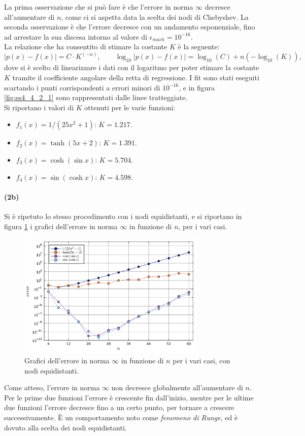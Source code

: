 \documentclass[letterpaper, 12pt]{article}
\begin{document}
La prima osservazione che si può fare è che l'errore in norma $\infty$ decresce all'aumentare di $n$,
come ci si aspetta data la scelta dei nodi di Chebyshev. La seconda osservazione è che l'errore decresce
con un andamento esponenziale, fino ad arrestare la sua discesa intorno al valore di $\epsilon_{mach} = 10^{-16}$. \\
La relazione che ha consentito di stimare la costante $K$ è la seguente:
\begin{equation}
    |p(x)-f(x)| = C \cdot K^(-n), \qquad \log_{10}|p(x)-f(x)| = \log_{10}(C) + n(-\log_{10}(K)),
\end{equation}
dove si è scelto di linearizzare i dati con il logaritmo per poter stimare la costante $K$ tramite
il coefficiente angolare della retta di regressione. I fit sono stati eseguiti scartando i punti corrispondenti
a errori minori di $10^{-16}$, e in figura \ref{fig:es4_4_2_1} sono rappresentati dalle linee tratteggiate. \\
Si riportano i valori di $K$ ottenuti per le varie funzioni:
\begin{itemize}
    \item $f_1(x) = 1/(25x^2+1)$: $K = 1.217$.
    \item $f_2(x) = \tanh(5 x+2)$: $K = 1.391$.
    \item $f_3(x) = \cosh(\sin x)$: $K = 5.704$.
    \item $f_4(x) = \sin(\cosh x)$: $K = 4.598$.
\end{itemize}

\paragraph{(2b) } Si è ripetuto lo stesso procedimento con i nodi equidistanti, e si riportano in figura \ref{fig:es4_4_2_2}
i grafici dell'errore in norma $\infty$ in funzione di $n$, per i vari casi.
\begin{figure}[!ht]
    \centering
    \includegraphics[width=0.8\textwidth]{4422.pdf}
    \caption{Grafici dell'errore in norma $\infty$ in funzione di $n$ per i vari casi, con nodi equidistanti.}
    \label{fig:es4_4_2_2}
\end{figure}
Come atteso, l'errore in norma $\infty$ non decresce globalmente all'aumentare di $n$. Per le prime due funzioni
l'errore è crescente fin dall'inizio, mentre per le ultime due funzioni l'errore decresce fino a un certo punto, 
per tornare a crescere successivamente. È un comportamento noto come \textit{fenomeno di Runge}, ed è 
dovuto alla scelta dei nodi equidistanti. \\ 
\end{document}
